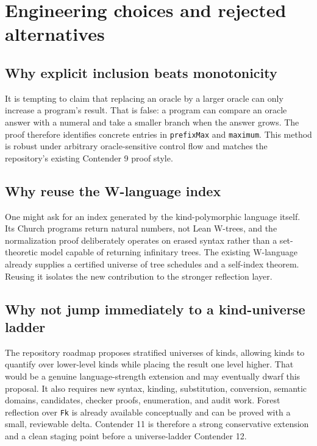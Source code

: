 \documentclass[11pt]{article}
\theoremstyle{definition}
\theoremstyle{remark}
\newcommand{\lean}[1]{\texttt{#1}}
\begin{document}
\section{Engineering choices and rejected alternatives}

\subsection{Why explicit inclusion beats monotonicity}

It is tempting to claim that replacing an oracle by a larger oracle can only
increase a program's result.  That is false: a program can compare an oracle
answer with a numeral and take a smaller branch when the answer grows.  The
proof therefore identifies concrete entries in \lean{prefixMax} and
\lean{maximum}.  This method is robust under arbitrary oracle-sensitive
control flow and matches the repository's existing Contender 9 proof style.

\subsection{Why reuse the W-language index}

One might ask for an index generated by the kind-polymorphic language itself.
Its Church programs return natural numbers, not Lean W-trees, and the
normalization proof deliberately operates on erased syntax rather than a
set-theoretic model capable of returning infinitary trees.  The existing
W-language already supplies a certified universe of tree schedules and a
self-index theorem.  Reusing it isolates the new contribution to the stronger
reflection layer.

\subsection{Why not jump immediately to a kind-universe ladder}

The repository roadmap proposes stratified universes of kinds, allowing kinds
to quantify over lower-level kinds while placing the result one level higher.
That would be a genuine language-strength extension and may eventually dwarf
this proposal.  It also requires new syntax, kinding, substitution, conversion,
semantic domains, candidates, checker proofs, enumeration, and audit work.
Forest reflection over \lean{Fk} is already available conceptually and can be
proved with a small, reviewable delta.  Contender 11 is therefore a strong
conservative extension and a clean staging point before a universe-ladder
Contender 12.
\end{document}

